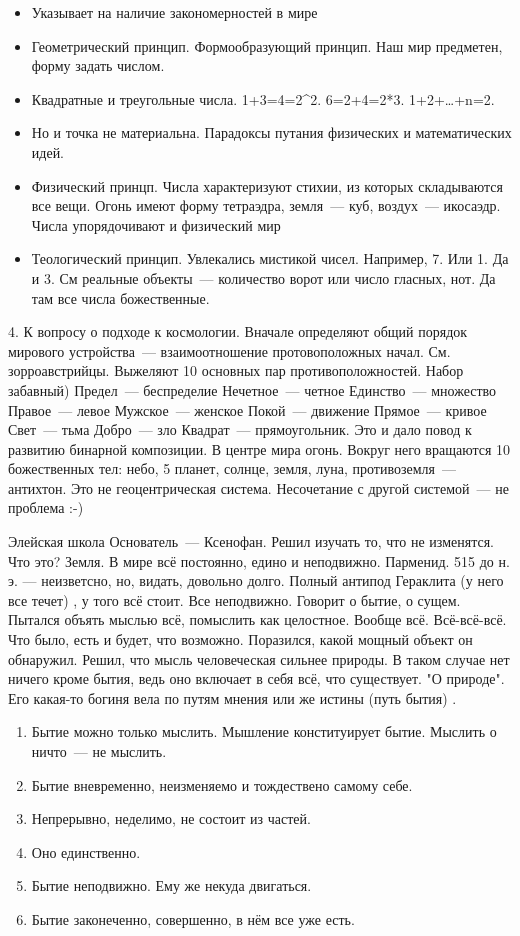 \begin{itemize}
	\item Указывает на наличие закономерностей в мире
	\item Геометрический принцип. Формообразующий принцип. Наш мир предметен, форму задать числом. 
	\item Квадратные и треугольные числа. 1+3=4=2^2. 6=2+4=2*3. 1+2+\ldots+n=2. 
	\item Но и точка не материальна. Парадоксы путания физических и математических идей. 
	\item Физический принцп. Числа характеризуют стихии, из которых складываются все вещи. Огонь имеют форму тетраэдра, земля~--- куб, воздух~--- икосаэдр. Числа упорядочивают и физический мир
	\item Теологический принцип. Увлекались мистикой чисел. Например, 7. Или 1. Да и 3. См реальные объекты~--- количество ворот или число гласных, нот. Да там все числа божественные. 
\end{itemize}

4. К вопросу о подходе к космологии. Вначале определяют общий порядок мирового устройства~--- взаимоотношение протовоположных начал. См. зорроавстрийцы. Выжеляют 10 основных пар противоположностей. Набор забавный) 
Предел~--- беспределие
Нечетное~--- четное
Единство~--- множество
Правое~--- левое
Мужское~--- женское
Покой~--- движение
Прямое~--- кривое
Свет~--- тьма
Добро~--- зло
Квадрат~--- прямоугольник. 
Это и дало повод к развитию бинарной композиции. 
В центре мира огонь. Вокруг него вращаются 10 божественных тел: небо, 5 планет, солнце, земля, луна, противоземля~--- антихтон. Это не геоцентрическая система. Несочетание с другой системой~--- не проблема :-) 

Элейская школа
Основатель~--- Ксенофан. Решил изучать то, что не изменятся. Что это? Земля. В мире всё постоянно, едино и неподвижно. 
Парменид. 515 до н. э. --- неизветсно, но, видать, довольно долго. Полный антипод Гераклита (у него все течет) , у того всё стоит. Все неподвижно. Говорит о бытие, о сущем. 
Пытался объять мыслью всё, помыслить как целостное. Вообще всё. Всё-всё-всё. Что было, есть и будет, что возможно. Поразился, какой мощный объект он обнаружил. Решил, что мысль человеческая сильнее природы. 
В таком случае нет ничего кроме бытия, ведь оно включает в себя всё, что существует. "О природе". Его какая-то богиня вела по путям мнения или же истины (путь бытия) . 
\begin{enumerate}
	\item Бытие можно только мыслить. Мышление конституирует бытие. Мыслить о ничто~--- не мыслить. 
	\item Бытие вневременно, неизменяемо и тождествено самому себе. 
	\item Непрерывно, неделимо, не состоит из частей. 
	\item Оно единственно. 
	\item Бытие неподвижно. Ему же некуда двигаться. 
	\item Бытие законеченно, совершенно, в нём все уже есть. 
\end{enumerate}


